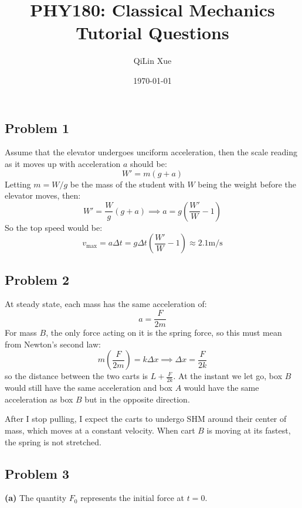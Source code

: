 \documentclass{article}
\title{PHY180: Classical Mechanics \\ Tutorial Questions}
\author{QiLin Xue}
\date{\today}
\begin{document}
\maketitle
\subsection*{Problem 1}
Assume that the elevator undergoes unciform acceleration, then the scale reading as it moves up with acceleration $a$ should be:
\begin{equation}
    W'=m(g+a)
    \label{eq:}
\end{equation}
Letting $m=W/g$ be the mass of the student with $W$ being the weight before the elevator moves, then:
\begin{equation}
    W'=\frac{W}{g}(g+a) \implies a = g\left(\frac{W'}{W}-1\right)
    \label{eq:}
\end{equation}
So the top speed would be:
\begin{equation}
    v_\text{max} = a\Delta t = g\Delta t\left(\frac{W'}{W}-1\right) \approx 2.1\si{\meter\per\second}
    \label{eq:}
\end{equation}
\subsection*{Problem 2}
At steady state, each mass has the same acceleration of:
\begin{equation}
    a = \frac{F}{2m}
    \label{eq:}
\end{equation}
For mass $B$, the only force acting on it is the spring force, so this must mean from Newton's second law:
\begin{equation}
    m\left(\frac{F}{2m}\right)=k\Delta x \implies \Delta x = \frac{F}{2k}
    \label{eq:}
\end{equation}
so the distance between the two carts is $\boxed{L+\frac{F}{2k}}$. At the instant we let go, box $B$ would still have the same acceleration and box $A$ would have the same acceleration as box $B$ but in the opposite direction.

\noindent After I stop pulling, I expect the carts to undergo SHM around their center of mass, which moves at a constant velocity. When cart $B$ is moving at its fastest, the spring is not stretched.

\subsection*{Problem 3}
\textbf{(a)} The quantity $F_0$ represents the initial force at $t=0$.
\end{document}
